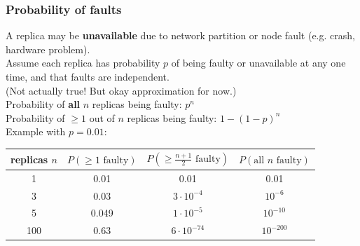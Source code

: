 \begin{frame}
    \label{s:fault-probability}
    \frametitle{Probability of faults}
    A replica may be \textbf{unavailable} due to network partition or node fault (e.g. crash, hardware problem).\\[1em]\pause
    Assume each replica has probability $p$ of being faulty or unavailable at any one time, and that faults are independent.\\
    {\footnotesize (Not actually true! But okay approximation for now.)}\\[1em]\pause
    Probability of \textbf{all} $n$ replicas being faulty: $p^n$\\
    Probability of $\ge 1$ out of $n$ replicas being faulty: $1-(1-p)^n$\\[1em]\pause
    Example with $p=0.01$:\\[0.5em]
    \begin{tabular}{c|c|c|c}
        \hline
        replicas $n$ & $P(\ge 1 \text{ faulty})$ & $P(\ge \frac{n+1}{2}\text{ faulty})$ & $P(\text{all } n \text{ faulty})$ \\\hline
        1 & 0.01 & 0.01 & 0.01 \\
        3 & 0.03 & $3 \cdot 10^{-4}$ & $10^{-6}$ \\
        5 & 0.049 & $1 \cdot 10^{-5}$ & $10^{-10}$ \\
        100 & 0.63 & $6 \cdot 10^{-74}$ & $10^{-200}$ \\\hline
    \end{tabular}
\end{frame}
\label{l:fault-probability}

%
%
%

